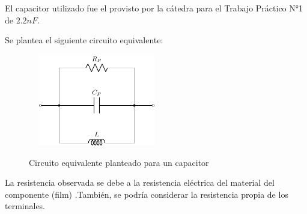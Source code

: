 El capacitor utilizado fue el provisto por la cátedra para el Trabajo Práctico N°1 de $2.2nF$.
\par \par
Se plantea el siguiente circuito equivalente:

\begin{figure}[H]
\centering
\includegraphics[width=6cm,height=4cm]{Ejercicio_1(Germo)/Circuitos/circuito_equivalente_capacitor_todoparalelo.pdf}
\label{fig:circuito_equivalente_capacitor_todoparalelo}
\caption{Circuito equivalente planteado para un capacitor}
\end{figure}
La resistencia observada se debe a la resistencia eléctrica del material del componente (film) .También, se podría considerar la resistencia propia de los terminales. \par

